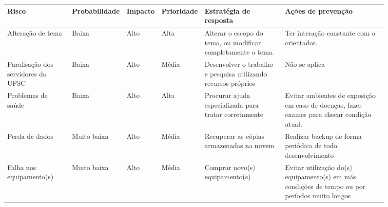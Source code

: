 \documentclass{ufsctex/ufsctex}
\begin{document}
\begin{figure}[htbp]
  \footnotesize
    \begin{tabular}{|P{1.3cm}|*{3}{P{0.8cm}|}*{2}{P{2.24cm}|}}
    \hline {}
    \textbf{Risco} & \textbf{Proba\-bilidade} & \textbf{Impacto}
      & \textbf{Priori\-dade} & \textbf{Estratégia de resposta}
      & \textbf{Ações de prevenção} \\
	\hline Alteração de tema & Baixa & Alto & Alta
	  & Alterar o escopo do tema, ou modificar completamente o tema.
	  & Ter interação constante com o orientador. \\
    \hline Paralisação dos servidores da UFSC & Baixa & Alto & Média
	  & Desenvolver o trabalho e pesquisa utilizando recursos próprios
      & Não se aplica \\
    \hline Problemas de saúde & Baixa & Alto & Alta
	  & Procurar ajuda especializada para tratar corretamente
	  & Evitar ambientes de exposição em caso de doenças, fazer exames
		para checar condição atual. \\
    \hline Perda de dados  & Muito baixa & Alto & Média
      & Recuperar as cópias armazenadas na nuvem
	  & Realizar backup de forma periódica de todo desenvolvimento \\
    \hline Falha nos equipamento(s) & Muito baixa & Alto & Média
      & Comprar novo(s) equipamento(s)
      & Evitar utilização do(s) equipamento(s) em más condições de tempo ou
        por períodos muito longos \\
    \hline
  \end{tabular}
\end{figure}



\end{document}
